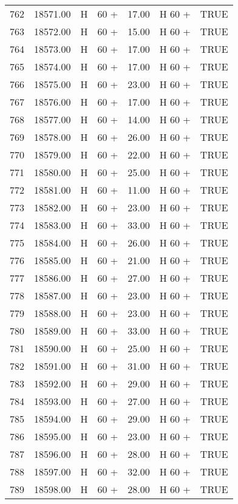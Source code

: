 \begin{table}[ht]
\begin{tabular}{rrllrll}
  762 & 18571.00 & H & 60 + & 17.00 & H 60 + & TRUE \\ 
  763 & 18572.00 & H & 60 + & 15.00 & H 60 + & TRUE \\ 
  764 & 18573.00 & H & 60 + & 17.00 & H 60 + & TRUE \\ 
  765 & 18574.00 & H & 60 + & 17.00 & H 60 + & TRUE \\ 
  766 & 18575.00 & H & 60 + & 23.00 & H 60 + & TRUE \\ 
  767 & 18576.00 & H & 60 + & 17.00 & H 60 + & TRUE \\ 
  768 & 18577.00 & H & 60 + & 14.00 & H 60 + & TRUE \\ 
  769 & 18578.00 & H & 60 + & 26.00 & H 60 + & TRUE \\ 
  770 & 18579.00 & H & 60 + & 22.00 & H 60 + & TRUE \\ 
  771 & 18580.00 & H & 60 + & 25.00 & H 60 + & TRUE \\ 
  772 & 18581.00 & H & 60 + & 11.00 & H 60 + & TRUE \\ 
  773 & 18582.00 & H & 60 + & 23.00 & H 60 + & TRUE \\ 
  774 & 18583.00 & H & 60 + & 33.00 & H 60 + & TRUE \\ 
  775 & 18584.00 & H & 60 + & 26.00 & H 60 + & TRUE \\ 
  776 & 18585.00 & H & 60 + & 21.00 & H 60 + & TRUE \\ 
  777 & 18586.00 & H & 60 + & 27.00 & H 60 + & TRUE \\ 
  778 & 18587.00 & H & 60 + & 23.00 & H 60 + & TRUE \\ 
  779 & 18588.00 & H & 60 + & 23.00 & H 60 + & TRUE \\ 
  780 & 18589.00 & H & 60 + & 33.00 & H 60 + & TRUE \\ 
  781 & 18590.00 & H & 60 + & 25.00 & H 60 + & TRUE \\ 
  782 & 18591.00 & H & 60 + & 31.00 & H 60 + & TRUE \\ 
  783 & 18592.00 & H & 60 + & 29.00 & H 60 + & TRUE \\ 
  784 & 18593.00 & H & 60 + & 27.00 & H 60 + & TRUE \\ 
  785 & 18594.00 & H & 60 + & 29.00 & H 60 + & TRUE \\ 
  786 & 18595.00 & H & 60 + & 23.00 & H 60 + & TRUE \\ 
  787 & 18596.00 & H & 60 + & 28.00 & H 60 + & TRUE \\ 
  788 & 18597.00 & H & 60 + & 32.00 & H 60 + & TRUE \\ 
  789 & 18598.00 & H & 60 + & 28.00 & H 60 + & TRUE \\ 

\end{tabular}
\end{table}

